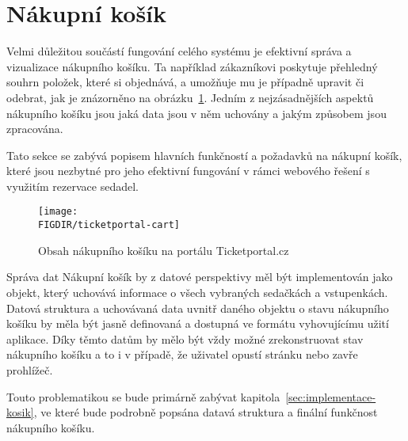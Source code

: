 \section{Nákupní košík}
\label{sec:identifikace-nakupni-kosik}
Velmi důležitou součástí fungování celého systému je efektivní správa a vizualizace nákupního košíku.
Ta například zákazníkovi poskytuje přehledný souhrn položek, které si objednává, a umožňuje mu je případně upravit či odebrat, jak je znázorněno na obrázku~\ref{fig:ticketportal-cart}.
Jedním z nejzásadnějších aspektů nákupního košíku jsou jaká data jsou v něm uchovány a jakým způsobem jsou zpracována.

Tato sekce se zabývá popisem hlavních funkčností a požadavků na nákupní košík, které jsou nezbytné pro jeho efektivní fungování v rámci webového řešení s využitím rezervace sedadel.

\begin{figure}[H]
    \texttt{[image: \\FIGDIR/ticketportal-cart]}
    \centering
    \caption{Obsah nákupního košíku na portálu Ticketportal.cz\cite{t__www_ticketportal_cz}}
    \label{fig:ticketportal-cart}
\end{figure}

\begin{subsection}{Správa dat}
    \label{subsec:identifikace-nakupni-kosik-sprava}
    Nákupní košík by z datové perspektivy měl být implementován jako objekt, který uchovává informace o všech vybraných sedačkách a vstupenkách.
    Datová struktura a uchovávaná data uvnitř daného objektu o stavu nákupního košíku by měla být jasně definovaná a dostupná ve formátu vyhovujícímu užití aplikace.
    Díky těmto datům by mělo být vždy možné zrekonstruovat stav nákupního košíku a to i v případě, že uživatel opustí stránku nebo zavře prohlížeč.

    Touto problematikou se bude primárně zabývat kapitola~\ref{sec:implementace-kosik}, ve které bude podrobně popsána datavá struktura a finální funkčnost nákupního košíku.
\end{subsection}

